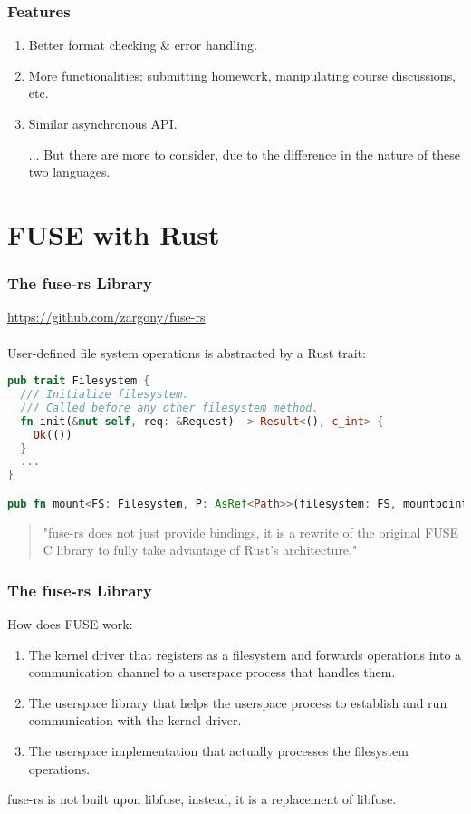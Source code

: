 \documentclass[usenames,xcolor=svgnames,11pt,sans]{beamer}
\newcommand{\key}[1]{{\color{theme} #1}}
\begin{document}
\begin{frame}
\frametitle{Features}
\begin{enumerate}
  \item Better format checking \& error handling.
  \item More functionalities: submitting homework, manipulating course discussions, etc.
  \item Similar asynchronous API.
  
  \pause
  
  ... But there are more to consider, due to the difference in the nature of these two languages.
\end{enumerate}
\end{frame}

\section{FUSE with Rust}

\begin{frame}[fragile]
\frametitle{The fuse-rs Library}

\href{https://github.com/zargony/fuse-rs}{https://github.com/zargony/fuse-rs}
\pause
~\\~\\
User-defined file system operations is abstracted by a Rust trait:

\begin{lstlisting}[language=Rust,morendkeywords={Path,OsStr}]
pub trait Filesystem {
  /// Initialize filesystem.
  /// Called before any other filesystem method.
  fn init(&mut self, req: &Request) -> Result<(), c_int> {
    Ok(())
  }
  ...
}

pub fn mount<FS: Filesystem, P: AsRef<Path>>(filesystem: FS, mountpoint: P, options: &[&OsStr]);
\end{lstlisting}

\pause

\begin{quote}
  "fuse-rs does not just provide bindings, it is a rewrite of the original FUSE C library to fully take advantage of Rust's architecture."
\end{quote}

\end{frame}

\begin{frame}
\frametitle{The fuse-rs Library}
How does FUSE work:

\pause
\begin{enumerate}
  \item The \key{kernel driver} that registers as a filesystem and forwards operations into a communication channel to a userspace process that handles them.
  \item The \key{userspace library} that helps the userspace process to establish and run communication with the kernel driver.
  \item The \key{userspace implementation} that actually processes the filesystem operations.
\end{enumerate}

\pause
fuse-rs is \key{not} built upon libfuse, instead, it is a \key{replacement} of libfuse.

\end{frame}
\end{document}
